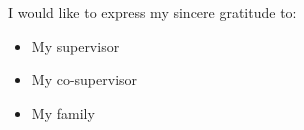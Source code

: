 

\begin{acknowledgement}

I would like to express my sincere gratitude to:

\begin{itemize}
 \item My supervisor
 \vspace*{3mm}
 \item My co-supervisor
 \vspace*{3mm}
 \item My family
 \vspace*{3mm}
\end{itemize}

\newpage
\end{acknowledgement}